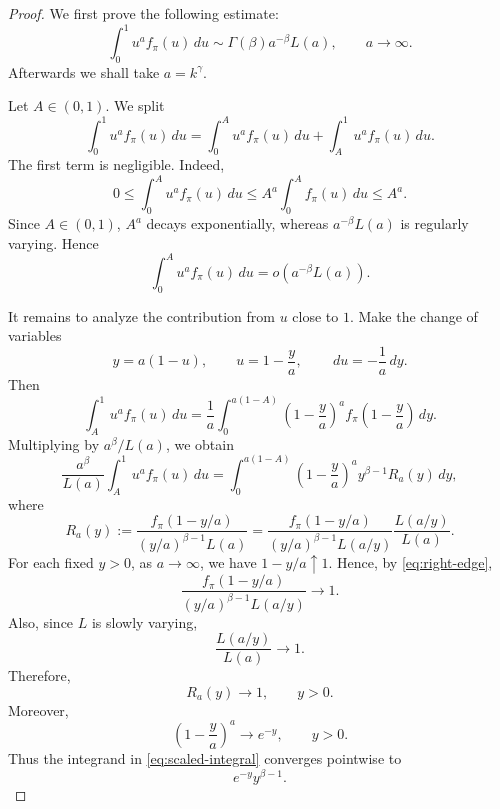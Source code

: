 \documentclass[reqno,final,11pt]{amsart}
\newcommand{\dd}{\,d}
\theoremstyle{plain}
\theoremstyle{definition}
\theoremstyle{remark}
\numberwithin{equation}{section}
\begin{document}
\begin{proof}
We first prove the following estimate:
\begin{equation}\label{eq:abelian-step}
  \int_0^1 u^a f_\pi(u)\dd u
  \sim
  \Gamma(\beta)a^{-\beta}L(a),
  \qquad a\to\infty.
\end{equation}
Afterwards we shall take \(a=k^\gamma\).

Let \(A\in(0,1)\). We split
\[
  \int_0^1 u^a f_\pi(u)\dd u
  =
  \int_0^A u^a f_\pi(u)\dd u
  +
  \int_A^1 u^a f_\pi(u)\dd u.
\]
The first term is negligible. Indeed,
\[
  0\le
  \int_0^A u^a f_\pi(u)\dd u
  \le
  A^a\int_0^A f_\pi(u)\dd u
  \le A^a.
\]
Since \(A\in(0,1)\), \(A^a\) decays exponentially, whereas
\(a^{-\beta}L(a)\) is regularly varying. Hence
\[
  \int_0^A u^a f_\pi(u)\dd u
  =
  o\left(a^{-\beta}L(a)\right).
\]

It remains to analyze the contribution from \(u\) close to \(1\). Make the
change of variables
\[
  y=a(1-u),
  \qquad
  u=1-\frac ya,
  \qquad
  \dd u=-\frac1a\dd y.
\]
Then
\[
  \int_A^1 u^a f_\pi(u)\dd u
  =
  \frac1a
  \int_0^{a(1-A)}
  \left(1-\frac ya\right)^a
  f_\pi\left(1-\frac ya\right)\dd y.
\]
Multiplying by \(a^\beta/L(a)\), we obtain
\begin{equation}\label{eq:scaled-integral}
  \frac{a^\beta}{L(a)}
  \int_A^1 u^a f_\pi(u)\dd u
  =
  \int_0^{a(1-A)}
  \left(1-\frac ya\right)^a
  y^{\beta-1}
  R_a(y)\dd y,
\end{equation}
where
\[
  R_a(y)
  :=
  \frac{
  f_\pi(1-y/a)
  }{
  (y/a)^{\beta-1}L(a)
  }
  =
  \frac{
  f_\pi(1-y/a)
  }{
  (y/a)^{\beta-1}L(a/y)
  }
  \frac{L(a/y)}{L(a)}.
\]
For each fixed \(y>0\), as \(a\to\infty\), we have \(1-y/a\uparrow1\). Hence,
by \eqref{eq:right-edge},
\[
  \frac{
  f_\pi(1-y/a)
  }{
  (y/a)^{\beta-1}L(a/y)
  }
  \longrightarrow 1.
\]
Also, since \(L\) is slowly varying,
\[
  \frac{L(a/y)}{L(a)}
  \longrightarrow 1.
\]
Therefore,
\[
  R_a(y)\longrightarrow 1,
  \qquad y>0.
\]
Moreover,
\[
  \left(1-\frac ya\right)^a\longrightarrow e^{-y},
  \qquad y>0.
\]
Thus the integrand in \eqref{eq:scaled-integral} converges pointwise to
\[
  e^{-y}y^{\beta-1}.
\]


\end{proof}
\end{document}
